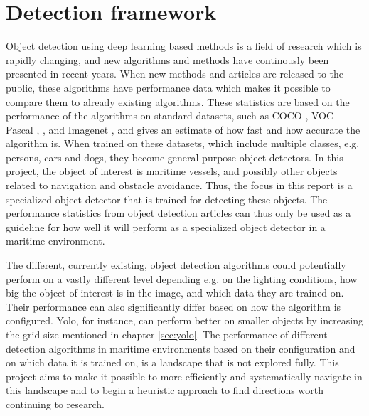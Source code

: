 \section{Detection framework}
Object detection using deep learning based methods is a field of research which is rapidly changing, and new algorithms and methods have continously been presented in recent years. When new methods and articles are released to the public, these algorithms have performance data which makes it possible to compare them to already existing algorithms. These statistics are based on the performance of the algorithms on standard datasets, such as COCO \citep{COCO}, VOC Pascal \citep{Everingham2007}, \citep{Everingham2012}, and Imagenet \citep{Imagenet}, and gives an estimate of how fast and how accurate the algorithm is. When trained on these datasets, which include multiple classes, e.g. persons, cars and dogs, they become general purpose object detectors. In this project, the object of interest is maritime vessels, and possibly other objects related to navigation and obstacle avoidance. Thus, the focus in this report is a specialized object detector that is trained for detecting these objects. The performance statistics from object detection articles can thus only be used as a guideline for how well it will perform as a specialized object detector in a maritime environment. 

\vspace{3mm}

\noindent
The different, currently existing, object detection algorithms could potentially perform on a vastly different level depending e.g. on the lighting conditions, how big the object of interest is in the image, and which data they are trained on. Their performance can also significantly differ based on how the algorithm is configured. Yolo, for instance, can perform better on smaller objects by increasing the grid size mentioned in chapter \ref{sec:yolo}. The performance of different detection algorithms in maritime environments based on their configuration and on which data it is trained on, is a landscape that is not explored fully. This project aims to make it possible to more efficiently and systematically navigate in this landscape and to begin a heuristic approach to find directions worth continuing to research.

